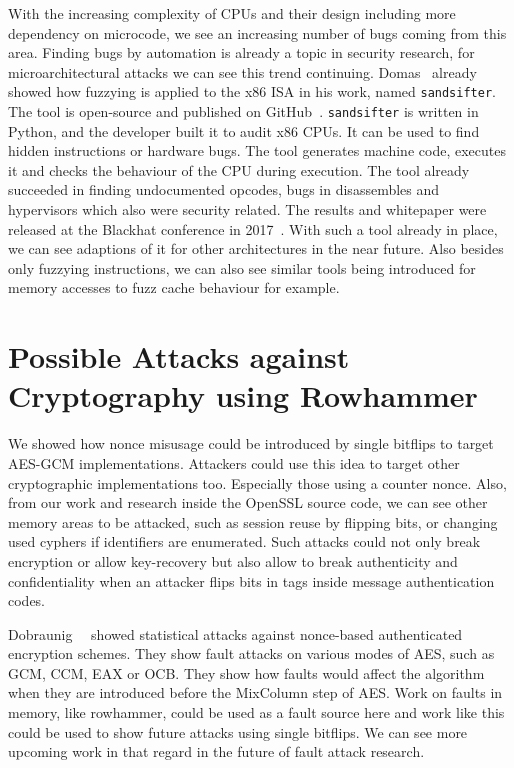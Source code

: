 With the increasing complexity of CPUs and their design including more
dependency on microcode, we see an increasing number of bugs coming from this
area. Finding bugs by automation is already a topic in security research, for
microarchitectural attacks we can see this trend continuing.
Domas~\cite{sandsifter} already showed how fuzzying is applied to the x86 ISA in
his work, named \texttt{sandsifter}. The tool is open-source and published on
GitHub~\cite{sandsifterurl}. \texttt{sandsifter} is written in Python, and the
developer built it to audit x86 CPUs. It can be used to find hidden instructions
or hardware bugs. The tool generates machine code, executes it and checks the
behaviour of the CPU during execution. The tool already succeeded in finding
undocumented opcodes, bugs in disassembles and hypervisors which also were
security related. The results and whitepaper were released at the Blackhat
conference in 2017~\cite{sandsifter}. With such a tool already in place, we can
see adaptions of it for other architectures in the near future. Also besides
only fuzzying instructions, we can also see similar tools being introduced for
memory accesses to fuzz cache behaviour for example.

\section{Possible Attacks against Cryptography using Rowhammer}

We showed how nonce misusage could be introduced by single bitflips to target
AES-GCM implementations. Attackers could use this idea to target other
cryptographic implementations too. Especially those using a counter nonce. Also,
from our work and research inside the OpenSSL source code, we can see other
memory areas to be attacked, such as session reuse by flipping bits, or changing
used cyphers if identifiers are enumerated. Such attacks could not only break
encryption or allow key-recovery but also allow to break authenticity and
confidentiality when an attacker flips bits in tags inside message
authentication codes.

Dobraunig~\etal~\cite{noncestat} showed statistical attacks against nonce-based
authenticated encryption schemes. They show fault attacks on various modes of
AES, such as GCM, CCM, EAX or OCB. They show how faults would affect the
algorithm when they are introduced before the MixColumn step of AES. Work on
faults in memory, like rowhammer, could be used as a fault source here and work
like this could be used to show future attacks using single bitflips. We can see
more upcoming work in that regard in the future of fault attack research.

